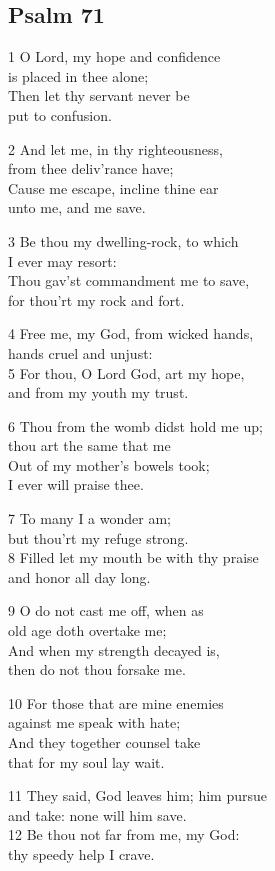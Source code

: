 \subsection*{Psalm 71}

1 O Lord, my hope and confidence\\
is placed in thee alone;\\
Then let thy servant never be\\
put to confusion.

2 And let me, in thy righteousness,\\
from thee deliv’rance have;\\
Cause me escape, incline thine ear\\
unto me, and me save.

3 Be thou my dwelling-rock, to which\\
I ever may resort:\\
Thou gav’st commandment me to save,\\
for thou’rt my rock and fort.

4 Free me, my God, from wicked hands,\\
hands cruel and unjust:\\
5 For thou, O Lord God, art my hope,\\
and from my youth my trust.

6 Thou from the womb didst hold me up;\\
thou art the same that me\\
Out of my mother’s bowels took;\\
I ever will praise thee.

7 To many I a wonder am;\\
but thou’rt my refuge strong.\\
8 Filled let my mouth be with thy praise\\
and honor all day long.

9 O do not cast me off, when as\\
old age doth overtake me;\\
And when my strength decayed is,\\
then do not thou forsake me.

10 For those that are mine enemies\\
against me speak with hate;\\
And they together counsel take\\
that for my soul lay wait.

11 They said, God leaves him; him pursue\\
and take: none will him save.\\
12 Be thou not far from me, my God:\\
thy speedy help I crave.


